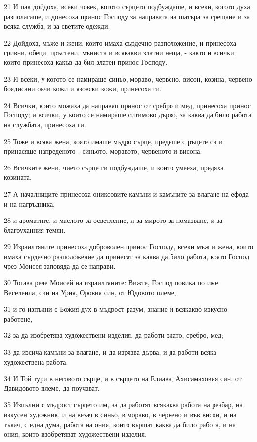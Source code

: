 \par 21 И пак дойдоха, всеки човек, когото сърцето подбуждаше, и всеки, когото духа разполагаше, и донесоха принос Господу за направата на шатъра за срещане и за всяка служба, и за светите одежди.
\par 22 Дойдоха, мъже и жени, които имаха сърдечно разположение, и принесоха гривни, обеци, пръстени, мъниста и всякакви златни неща, - както и всички, които принесоха какъв да бил златен принос Господу.
\par 23 И всеки, у когото се намираше синьо, мораво, червено, висон, козина, червено боядисани овчи кожи и язовски кожи, принесоха ги.
\par 24 Всички, които можаха да направяп принос от сребро и мед, принесоха принос Господу; и всички, у които се намираше ситимово дърво, за каква да било работа на службата, принесоха ги.
\par 25 Тоже и всяка жена, която имаше мъдро сърце, предеше с ръцете си и принасяше напреденото - синьото, моравото, червеното и висона.
\par 26 Всичките жени, чието сърце ги подбуждаше, и които умееха, предяха козината.
\par 27 А началниците принесоха ониксовите камъни и камъните за влагане на ефода и на нагръдника,
\par 28 и ароматите, и маслото за осветление, и за мирото за помазване, и за благоуханния темян.
\par 29 Израилтяните принесоха доброволен принос Господу, всеки мъж и жена, които имаха сърдечно разположение да принесат за каква да било работа, която Господ чрез Моисея заповяда да се направи.
\par 30 Тогава рече Моисей на израилтяните: Вижте, Господ повика по име Веселеила, син на Урия, Оровия син, от Юдовото племе,
\par 31 и го изпълни с Божия дух в мъдрост разум, знание и всякакво изкусно работене,
\par 32 за да изобретява художествени изделия, да работи злато, сребро, мед;
\par 33 да изсича камъни за влагане, и да изрязва дърва, и да работи всяка художествена работа.
\par 34 И Той тури в неговото сърце, и в сърцето на Елиава, Ахисамаховия син, от Давидовото племе, да поучават.
\par 35 Изпълни с мъдрост сърцето им, за да работят всякаква работа на резбар, на изкусен художник, и на везач в синьо, в мораво, в червено и във висон, и на тъкач, с една дума, работа на ония, които вършат каква да било работа, и на ония, които изобретяват художествени изделия.

